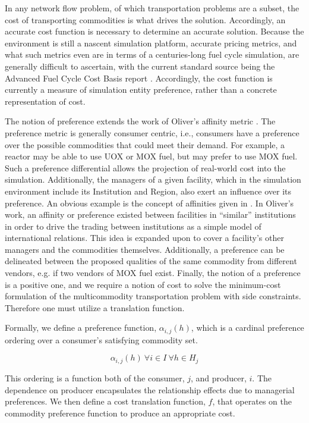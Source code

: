 In any network flow problem, of which transportation problems are a subset, the
cost of transporting commodities is what drives the solution. Accordingly, an
accurate cost function is necessary to determine an accurate solution. Because
the \Cyclus environment is still a nascent simulation platform, accurate pricing
metrics, and what such metrics even are in terms of a centuries-long fuel cycle
simulation, are generally difficult to ascertain, with the current standard source
being the Advanced Fuel Cycle Cost Basis
report \cite{shropshire__advanced_2009}. Accordingly, the cost function is
currently a measure of simulation entity preference, rather than a concrete
representation of cost.

The notion of preference extends the work of Oliver's affinity metric
\cite{oliver_geniusv2:_2009}. The preference metric is generally consumer
centric, i.e., consumers have a preference over the possible commodities that
could meet their demand. For example, a reactor may be able to use UOX or MOX
fuel, but may prefer to use MOX fuel. Such a preference differential allows the
projection of real-world cost into the simulation. Additionally, the managers of
a given facility, which in the \Cyclus simulation environment include its
Institution and Region, also exert an influence over its preference. An obvious
example is the concept of affinities given in \cite{oliver_geniusv2:_2009}. In
Oliver's work, an affinity or preference existed between facilities in
``similar'' institutions in order to drive the trading between institutions as a
simple model of international relations. This idea is expanded upon to cover a
facility's other managers and the commodities themselves. Additionally, a
preference can be delineated between the proposed qualities of the same
commodity from different vendors, e.g. if two vendors of MOX fuel
exist. Finally, the notion of a preference is a positive one, and we require a
notion of cost to solve the minimum-cost formulation of the multicommodity
transportation problem with side constraints. Therefore one must utilize a
translation function.

Formally, we define a preference function, $\alpha_{i,j}(h)$, which is a
cardinal preference ordering over a consumer's satisfying commodity set.

\begin{equation}
\alpha_{i,j}(h) \: \forall i \in I \: \forall h \in H_{j} 
\end{equation}

This ordering is a function both of the consumer, $j$, and producer, $i$. The
dependence on producer encapsulates the relationship effects due to managerial
preferences. We then define a cost translation function, $f$, that operates on
the commodity preference function to produce an appropriate cost.

